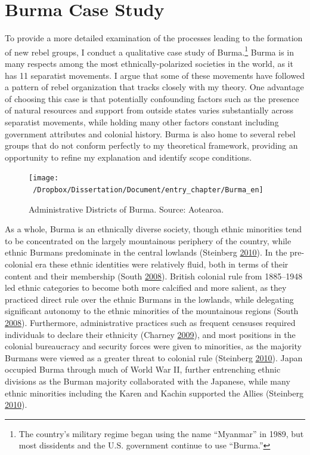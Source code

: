 \documentclass[12pt,]{book}
\let\rmarkdownfootnote\footnote%
\def\footnote{\protect\rmarkdownfootnote}
\theoremstyle{definition}
\theoremstyle{definition}
\theoremstyle{definition}
\theoremstyle{remark}
\begin{document}
\hypertarget{burma-case-study}{%
\section{Burma Case Study}\label{burma-case-study}}

To provide a more detailed examination of the processes leading to the
formation of new rebel groups, I conduct a qualitative case study of
Burma.\footnote{The country's military regime began using the name
  ``Myanmar'' in 1989, but most dissidents and the U.S. government
  continue to use ``Burma.''} Burma is in many respects among the most
ethnically-polarized societies in the world, as it has 11 separatist
movements. I argue that some of these movements have followed a pattern
of rebel organization that tracks closely with my theory. One advantage
of choosing this case is that potentially confounding factors such as
the presence of natural resources and support from outside states varies
substantially across separatist movements, while holding many other
factors constant including government attributes and colonial history.
Burma is also home to several rebel groups that do not conform perfectly
to my theoretical framework, providing an opportunity to refine my
explanation and identify scope conditions.

\begin{figure}

{\centering \texttt{[image: ~/Dropbox/Dissertation/Document/entry\_chapter/Burma\_en]} 

}

\caption{Administrative Districts of Burma. Source: Aotearoa.}\label{fig:burmamap}
\end{figure}

As a whole, Burma is an ethnically diverse society, though ethnic
minorities tend to be concentrated on the largely mountainous periphery
of the country, while ethnic Burmans predominate in the central lowlands
(Steinberg \protect\hyperlink{ref-Steinberg2010}{2010}). In the
pre-colonial era these ethnic identities were relatively fluid, both in
terms of their content and their membership (South
\protect\hyperlink{ref-South2008}{2008}). British colonial rule from
1885--1948 led ethnic categories to become both more calcified and more
salient, as they practiced direct rule over the ethnic Burmans in the
lowlands, while delegating significant autonomy to the ethnic minorities
of the mountainous regions (South
\protect\hyperlink{ref-South2008}{2008}). Furthermore, administrative
practices such as frequent censuses required individuals to declare
their ethnicity (Charney \protect\hyperlink{ref-Charney2009}{2009}), and
most positions in the colonial bureaucracy and security forces were
given to minorities, as the majority Burmans were viewed as a greater
threat to colonial rule (Steinberg
\protect\hyperlink{ref-Steinberg2010}{2010}). Japan occupied Burma
through much of World War II, further entrenching ethnic divisions as
the Burman majority collaborated with the Japanese, while many ethnic
minorities including the Karen and Kachin supported the Allies
(Steinberg \protect\hyperlink{ref-Steinberg2010}{2010}).
\end{document}
